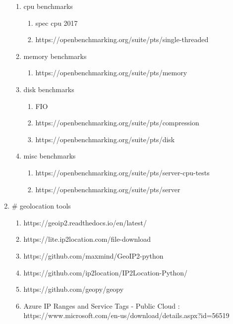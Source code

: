 \documentclass[11pt]{article}
\begin{document}
\begin{enumerate}
\begin{enumerate}
            \item cpu benchmarks
            \begin{enumerate}
                \item spec cpu 2017
                \item https://openbenchmarking.org/suite/pts/single-threaded
            \end{enumerate}

            \item memory benchmarks
            \begin{enumerate}
                \item https://openbenchmarking.org/suite/pts/memory
            \end{enumerate}

            \item disk benchmarks
            \begin{enumerate}
                \item FIO
                \item https://openbenchmarking.org/suite/pts/compression
                \item https://openbenchmarking.org/suite/pts/disk
            \end{enumerate}

            \item misc benchmarks
            \begin{enumerate}
                \item https://openbenchmarking.org/suite/pts/server-cpu-tests
                \item https://openbenchmarking.org/suite/pts/server
            \end{enumerate}
        \end{enumerate}

        \item # geolocation tools
        \begin{enumerate}
            \item https://geoip2.readthedocs.io/en/latest/
            \item https://lite.ip2location.com/file-download
            \item https://github.com/maxmind/GeoIP2-python
            \item https://github.com/ip2location/IP2Location-Python/
            \item https://github.com/geopy/geopy
            \item Azure IP Ranges and Service Tags - Public Cloud : https://www.microsoft.com/en-us/download/details.aspx?id=56519
        \end{enumerate}
    \end{enumerate}
\end{document}
